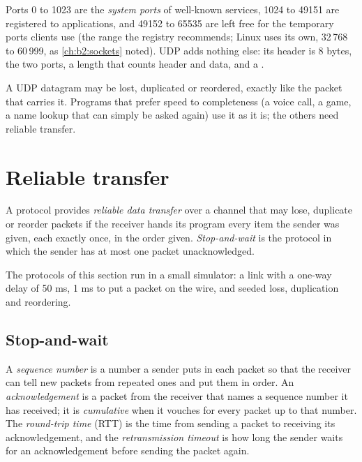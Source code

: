  Ports 0 to 1023 are the \emph{system ports} of
well-known services, 1024 to 49151 are registered to applications, and 49152 to 65535 are left free for the
temporary ports clients use (the range the registry recommends; Linux uses its own, 32\,768 to 60\,999, as
\cref{ch:b2:sockets} noted). UDP adds nothing else: its header is 8 bytes, the two ports, a length that counts header
and data, and a .


A UDP datagram may be lost, duplicated or reordered, exactly like the packet that carries it. Programs that prefer
speed to completeness (a voice call, a game, a name lookup that can simply be asked again) use it as it is; the others
need reliable transfer.

\section{Reliable transfer}\label{sec:b2:transport-layer:reliable}

\begin{definition}\label{def:b2:transport-layer:rdt}
A protocol provides \emph{reliable data transfer} over a channel that may lose,
duplicate or reorder packets if the receiver hands its program every item the sender was given, each exactly once,
in the order given. \emph{Stop-and-wait} is the protocol in which the sender has at most one
packet unacknowledged.
\end{definition}

The protocols of this section run in a small simulator: a link with a one-way delay of 50 ms, 1 ms to put a packet
on the wire, and seeded loss, duplication and reordering.

\subsection{Stop-and-wait}

\begin{definition}\label{def:b2:transport-layer:seq}
A \emph{sequence number} is a number a sender puts in each packet so that the receiver can
tell new packets from repeated ones and put them in order. An \emph{acknowledgement} is a packet from the receiver
that names a sequence number it has received; it is \emph{cumulative} when it
vouches for every packet up to that number. The \emph{round-trip time} (RTT) is the time from sending a packet to
receiving its acknowledgement, and the \emph{retransmission timeout} is how long the sender waits for an
acknowledgement before sending the packet again.
\end{definition}

